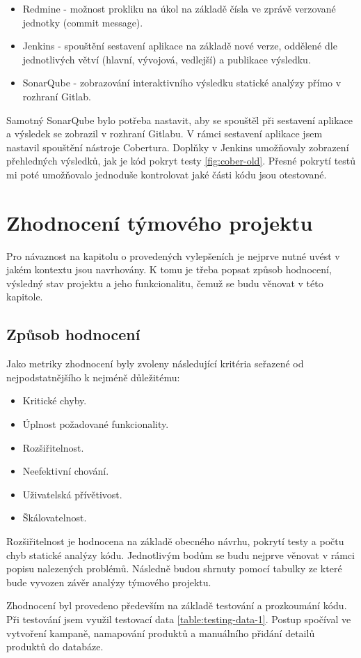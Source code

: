 \documentclass[thesis=B,czech]{FITthesis}[2012/06/26]
\begin{document}
\begin{itemize}
\item Redmine - možnost prokliku na úkol na základě čísla ve zprávě verzované jednotky (commit message).
\item Jenkins - spouštění sestavení aplikace na základě nové verze, oddělené dle jednotlivých větví (hlavní, vývojová, vedlejší) a
				publikace výsledku.
\item SonarQube - zobrazování interaktivního výsledku statické analýzy přímo v rozhraní Gitlab.
\end{itemize}

Samotný SonarQube bylo potřeba nastavit, aby se spouštěl při sestavení aplikace a výsledek se zobrazil v rozhraní
Gitlabu. V rámci sestavení aplikace jsem nastavil spouštění nástroje Cobertura.
Doplňky v Jenkins umožňovaly zobrazení přehledných výsledků, jak je kód pokryt testy \ref{fig:cober-old}. Přesné pokrytí testů mi poté umožňovalo 
jednoduše kontrolovat jaké části kódu jsou otestované.


\chapter{Zhodnocení týmového projektu}
Pro návaznost na kapitolu o provedených vylepšeních je nejprve nutné uvést v jakém kontextu jsou navrhovány. K tomu je třeba
popsat způsob hodnocení, výsledný stav projektu a jeho funkcionalitu, čemuž se budu věnovat v této kapitole.

\section{Způsob hodnocení}\label{sec:zhodnoceni-typ}
Jako metriky zhodnocení byly zvoleny následující kritéria seřazené od nejpodstatnějšího k nejméně důležitému: 

\begin{itemize}
\item Kritické chyby.
\item Úplnost požadované funkcionality.
\item Rozšiřitelnost.
\item Neefektivní chování.
\item Uživatelská přívětivost.
\item Škálovatelnost.
\end{itemize}

Rozšiřitelnost je hodnocena na základě obecného návrhu, pokrytí testy a počtu chyb statické analýzy kódu. 
Jednotlivým bodům se budu nejprve věnovat v rámci popisu nalezených problémů. Následně budou shrnuty pomocí tabulky ze které
bude vyvozen závěr analýzy týmového projektu.
\par
Zhodnocení byl provedeno především na základě testování a prozkoumání kódu.
Při testování jsem využil testovací data \ref{table:testing-data-1}. Postup spočíval ve vytvoření kampaně, namapování
produktů a manuálního přidání detailů produktů do databáze.
\end{document}
